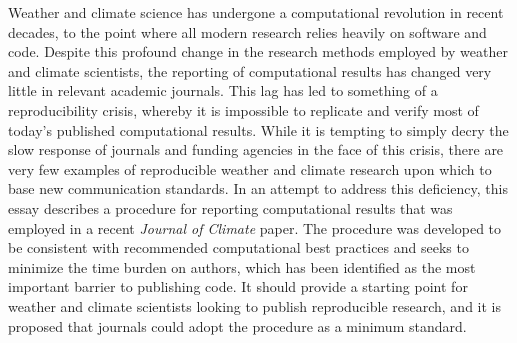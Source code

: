 Weather and climate science has undergone a computational revolution in recent decades, to the point where all modern research relies heavily on software and code. Despite this profound change in the research methods employed by weather and climate scientists, the reporting of computational results has changed very little in relevant academic journals. This lag has led to something of a reproducibility crisis, whereby it is impossible to replicate and verify most of today's published computational results. While it is tempting to simply decry the slow response of journals and funding agencies in the face of this crisis, there are very few examples of reproducible weather and climate research upon which to base new communication standards. In an attempt to address this deficiency, this essay describes a procedure for reporting computational results that was employed in a recent \textit{Journal of Climate} paper. The procedure was developed to be consistent with recommended computational best practices and seeks to minimize the time burden on authors, which has been identified as the most important barrier to publishing code. It should provide a starting point for weather and climate scientists looking to publish reproducible research, and it is proposed that journals could adopt the procedure as a minimum standard.

  
  
  
  